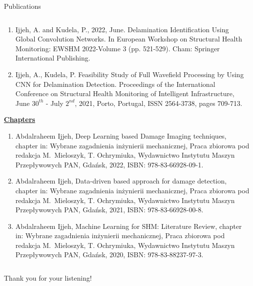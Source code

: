 \documentclass[10pt,aspectratio=169,dvipsnames]{beamer} %
\begin{document}
\begin{frame}{Publications}
\begin{tiny}
\begin{columns}[T]
\begin{column}[t]{0.48\textwidth}
\begin{enumerate}
						\item Ijjeh, A. and Kudela, P., 2022, June. Delamination Identification Using Global Convolution Networks. 
						In European Workshop on Structural Health Monitoring: EWSHM 2022-Volume 3 (pp. 521-529). Cham: Springer International Publishing.		
						\item {Ijjeh, A.}, Kudela, P. Feasibility Study of Full Wavefield Processing by Using CNN for Delamination Detection. 
						Proceedings of the International Conference on Structural Health Monitoring of Intelligent
						Infrastructure, June \(30^{th}\) - July \(2^{nd}\), 2021, Porto, Portugal, ISSN 2564-3738, pages 709-713.
					\end{enumerate}		
					\underline{\textbf{Chapters}}					
					\begin{enumerate}
						\justifying
						\item {Abdalraheem Ijjeh}, Deep Learning based Damage Imaging techniques, chapter in: Wybrane zagadnienia
						inżynierii mechanicznej, Praca zbiorowa pod redakcja M.~Mieloszyk, T. Ochrymiuka, Wydawnictwo Instytutu
						Maszyn Przepływowych PAN, Gdańsk, 2022, ISBN: 978-83-66928-09-1.
						\item {Abdalraheem Ijjeh}, Data-driven based approach for damage detection, chapter in: Wybrane zagadnienia
						inżynierii mechanicznej, Praca zbiorowa pod redakcja M.~Mieloszyk, T. Ochrymiuka, Wydawnictwo Instytutu
						Maszyn Przepływowych PAN, Gdańsk, 2021, ISBN: 978-83-66928-00-8.				
						\item {Abdalraheem Ijjeh}, Machine Learning for SHM: Literature Review, chapter in: Wybrane zagadnienia
						inżynierii mechanicznej, Praca zbiorowa pod redakcja M.~Mieloszyk, T. Ochrymiuka, Wydawnictwo Instytutu
						Maszyn Przepływowych PAN, Gdańsk, 2020, ISBN: 978-83-88237-97-3.
					\end{enumerate}
				\end{column}		
			\end{columns}
		\end{tiny}
	\end{frame}	
	\setcounter{subfigure}{0}
	{
		\begin{frame}[standout]
			\centering
			Thank you for your listening!\\ \vspace{12pt}
		\end{frame}
	}
\end{document}
